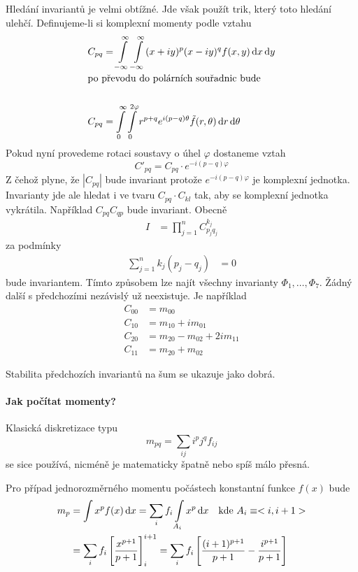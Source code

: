 Hledání invariantů je velmi obtížné. Jde však použít trik, který toto hledání ulehčí.
Definujeme-li si komplexní momenty podle vztahu
\begin{align}
C_{pq} &= \int\limits_{-\infty}^\infty\int\limits_{-\infty}^\infty(x+iy)^p(x-iy)^q f(x,y)\dif x\dif y\\
\noalign{\hbox{po převodu do polárních souřadnic bude}\nonumber}\\
C_{pq} &= \int\limits_0^\infty\int\limits_0^{2\varphi}r^{p+q}e^{i(p-q)\theta}\tilde{f}(r,\theta)\dif r\dif \theta
\end{align}
\noindent Pokud nyní provedeme rotaci soustavy o úhel $\varphi$ dostaneme vztah
\begin{equation}
{C'}_{pq}=C_{pq}\cdot e^{-i(p-q)\varphi}
\end{equation}
\noindent Z čehož plyne, že $|C_{pq}|$ bude invariant protože $e^{-i(p-q)\varphi}$ je komplexní jednotka.
Invarianty jde ale hledat i ve tvaru $C_{pq}\cdot C_{kl}$ tak, aby se komplexní jednotka vykrátila.
Například $C_{pq}C_{qp}$ bude invariant. Obecně
\begin{align}
I &= \prod\limits_{j=1}^nC_{p_jq_j}^{k_j}
\end{align}
za podmínky
\begin{align}
\sum\limits_{j=1}^nk_j(p_j-q_j) &= 0
\end{align}
\noindent bude invariantem. Tímto způsobem lze najít všechny invarianty $\Phi_1,\dots,\Phi_7$.
Žádný další s předchozími nezávislý už neexistuje. Je například
\begin{align}
C_{00} &= m_{00}\\
C_{10} &= m_{10}+im_{01}\\
C_{20} &= m_{20}-m_{02}+2im_{11}\\
C_{11} &= m_{20}+m_{02}
\end{align}

Stabilita předchozích invariantů na šum se ukazuje jako dobrá. 
\paragraph{Jak počítat momenty?}
Klasická diskretizace typu 
\begin{equation}
m_{pq}=\sum\limits_{ij}i^pj^qf_{ij}
\end{equation}
\noindent se sice používá, nicméně je
matematicky špatně nebo spíš málo přesná.

Pro případ jednorozměrného momentu počástech konstantní funkce $f(x)$ bude
\begin{align}
m_p &= \int x^p f(x)\dif x=\sum\limits_{i}f_i\int\limits_{A_i}x^p\dif x\quad\hbox{kde $A_i\equiv<i,i+1>$}\\
 &= \sum\limits_{i}f_i\left[\frac{x^{p+1}}{p+1}\right]^{i+1}_i=\sum\limits_{i}f_i
\left[\frac{(i+1)^{p+1}}{p+1}-\frac{i^{p+1}}{p+1}\right]
\end{align}

